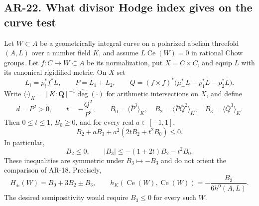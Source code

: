 \subsection*{AR-22. What divisor Hodge index gives on the curve test}

\begin{proposition}[AR-22]
Let $W\subset A$ be a geometrically integral curve on a polarized
abelian threefold $(A,L)$ over a number field $K$, and assume
$L\operatorname{Ce}(W)=0$ in rational Chow groups.  Let
$f:C\to W\subset A$ be its normalization, put $X=C\times C$, and
equip $L$ with its canonical rigidified metric.  On $X$ set
\[
 \overline L_i=p_i^*f^*\overline L,\qquad
 \overline P=\overline L_1+\overline L_2,\qquad
 \overline Q=(f\times f)^*
 \bigl(\mu_+^*\overline L-p_1^*\overline L-p_2^*\overline L\bigr).
\]
Write $\langle\cdot\rangle_K=[K:\mathbf Q]^{-1}\widehat{\deg}(\cdot)$
for arithmetic intersections on $X$, and define
\[
 d=P^2>0,\qquad t=-\frac{Q^2}{P^2},\qquad
 B_0=\langle\overline P^3\rangle_K,\quad
 B_2=\langle\overline P\overline Q^2\rangle_K,\quad
 B_3=\langle\overline Q^3\rangle_K.
\]
Then $0\le t\le1$, $B_0\ge0$, and for every real $a\in[-1,1]$,
\[
 B_2+aB_3+a^2(2tB_2+t^2B_0)\le0.                 \tag{AR.22a}
\]
In particular,
\[
 B_2\le0,\qquad
 |B_3|\le -(1+2t)B_2-t^2B_0.                    \tag{AR.22b}
\]
These inequalities are symmetric under $B_3\mapsto-B_3$ and do not
orient the comparison of AR-18.  Precisely,
\[
 H_\pm(W)=B_0+3B_2\pm B_3,\qquad
 h_K(\operatorname{Ce}(W),\operatorname{Ce}(W))
       =-\frac{B_3}{6h^0(A,L)}.                  \tag{AR.22c}
\]
The desired semipositivity would require $B_3\le0$ for every such $W$.
\end{proposition}

